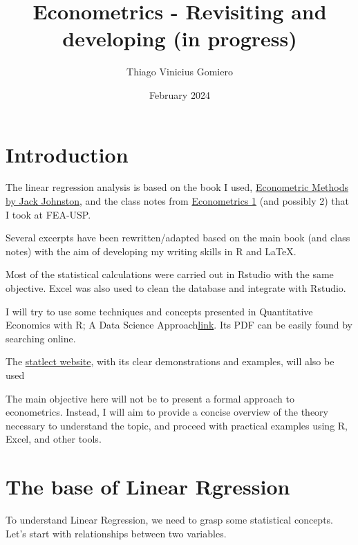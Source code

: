 \documentclass{article} %
\title{Econometrics - Revisiting and developing (in progress)} %
\author{Thiago  Vinicius Gomiero} %
\date{February 2024} %
\begin{document}


\maketitle %

\section{Introduction} %
The linear regression analysis is based on the book I used, \href{https://drive.google.com/file/d/1TIP3vEfFTzmsyAT_NdfeEucQ3Buzl79L/view?usp=sharing}{Econometric Methods by Jack Johnston}, and the class notes from \href{https://1drv.ms/o/s!AmlxSSt9Wu45_hK-coxj_ULKBVLC?e=dclINF}{Econometrics 1} (and possibly 2) that I took at FEA-USP.

Several excerpts have been rewritten/adapted based on the main book (and class notes) with the aim of developing my writing skills in R and LaTeX.

Most of the statistical calculations were carried out in Rstudio with the same objective. Excel was also used to clean the database and integrate with Rstudio.

I will try to use some techniques and concepts presented in Quantitative Economics with R; A Data Science Approach\href{https://link.springer.com/book/10.1007/978-981-15-2035-8}{link}. Its PDF can be easily found by searching online.

The \href{https://www.statlect.com/}{ statlect website}, with its clear demonstrations and examples, will also be used

The main objective here will not be to present a formal approach to econometrics. Instead, I will aim to provide a concise overview of the theory necessary to understand the topic, and proceed with practical examples using R, Excel, and other tools.


\section{The base of Linear Rgression}
To understand Linear Regression, we need to grasp some statistical concepts.
Let's start with relationships between two variables.
\end{document}
